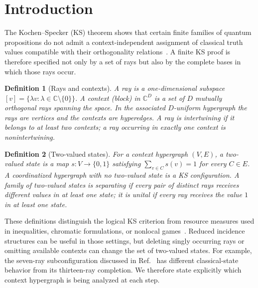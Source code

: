 \documentclass[%
  reprint,
  superscriptaddress,
  showpacs,
  showkeys,
  amsmath,amssymb,
  pra,
  longbibliography,
  floatfix,
  x11names
]{revtex4-2}
\newenvironment{revision}{\begingroup\color{revisionblue}}{\endgroup}
\newtheorem{definition}{Definition}
\begin{document}
\section{Introduction}

\begin{revision}
The Kochen--Specker (KS) theorem shows that certain finite families of quantum propositions do not admit a context-independent assignment of classical truth values compatible with their orthogonality relations~\cite{kochen1}.  A finite KS proof is therefore specified not only by a set of rays but also by the complete bases in which those rays occur.

\begin{definition}[Rays and contexts]
\label{def:contexts}
A \emph{ray} is a one-dimensional subspace $[v]=\{\lambda v:\lambda\in\mathbb{C}\setminus\{0\}\}$.  A \emph{context} (block) in $\mathbb{C}^D$ is a set of $D$ mutually orthogonal rays spanning the space.  In the associated $D$-uniform hypergraph the rays are vertices and the contexts are hyperedges.  A ray is \emph{intertwining} if it belongs to at least two contexts; a ray occurring in exactly one context is nonintertwining.
\end{definition}

\begin{definition}[Two-valued states]
\label{def:states}
For a context hypergraph $(V,E)$, a two-valued state is a map $s:V\to\{0,1\}$ satisfying $\sum_{v\in C}s(v)=1$ for every $C\in E$.  A coordinatized hypergraph with no two-valued state is a KS configuration.  A family of two-valued states is \emph{separating} if every pair of distinct rays receives different values in at least one state; it is \emph{unital} if every ray receives the value $1$ in at least one state.
\end{definition}

These definitions distinguish the logical KS criterion from resource measures used in inequalities, chromatic formulations, or nonlocal games~\cite{cabello:210401,2024-cabello-trandafir0,svozil-2025-color}.  Reduced incidence structures can be useful in those settings, but deleting singly occurring rays or omitting available contexts can change the set of two-valued states.  For example, the seven-ray subconfiguration discussed in Ref.~\cite[Fig.~6(a)]{pavicic-2025} has different classical-state behavior from its thirteen-ray completion.  We therefore state explicitly which context hypergraph is being analyzed at each step.


\end{revision}
\end{document}

